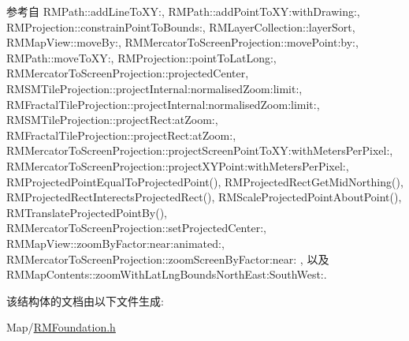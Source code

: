 参考自 R\-M\-Path\-::add\-Line\-To\-X\-Y\-:, R\-M\-Path\-::add\-Point\-To\-X\-Y\-:with\-Drawing\-:, R\-M\-Projection\-::constrain\-Point\-To\-Bounds\-:, R\-M\-Layer\-Collection\-::layer\-Sort, R\-M\-Map\-View\-::move\-By\-:, R\-M\-Mercator\-To\-Screen\-Projection\-::move\-Point\-:by\-:, R\-M\-Path\-::move\-To\-X\-Y\-:, R\-M\-Projection\-::point\-To\-Lat\-Long\-:, R\-M\-Mercator\-To\-Screen\-Projection\-::projected\-Center, R\-M\-S\-M\-Tile\-Projection\-::project\-Internal\-:normalised\-Zoom\-:limit\-:, R\-M\-Fractal\-Tile\-Projection\-::project\-Internal\-:normalised\-Zoom\-:limit\-:, R\-M\-S\-M\-Tile\-Projection\-::project\-Rect\-:at\-Zoom\-:, R\-M\-Fractal\-Tile\-Projection\-::project\-Rect\-:at\-Zoom\-:, R\-M\-Mercator\-To\-Screen\-Projection\-::project\-Screen\-Point\-To\-X\-Y\-:with\-Meters\-Per\-Pixel\-:, R\-M\-Mercator\-To\-Screen\-Projection\-::project\-X\-Y\-Point\-:with\-Meters\-Per\-Pixel\-:, R\-M\-Projected\-Point\-Equal\-To\-Projected\-Point(), R\-M\-Projected\-Rect\-Get\-Mid\-Northing(), R\-M\-Projected\-Rect\-Interects\-Projected\-Rect(), R\-M\-Scale\-Projected\-Point\-About\-Point(), R\-M\-Translate\-Projected\-Point\-By(), R\-M\-Mercator\-To\-Screen\-Projection\-::set\-Projected\-Center\-:, R\-M\-Map\-View\-::zoom\-By\-Factor\-:near\-:animated\-:, R\-M\-Mercator\-To\-Screen\-Projection\-::zoom\-Screen\-By\-Factor\-:near\-: , 以及 R\-M\-Map\-Contents\-::zoom\-With\-Lat\-Lng\-Bounds\-North\-East\-:\-South\-West\-:.



该结构体的文档由以下文件生成\-:\begin{DoxyCompactItemize}
\item 
Map/\hyperlink{_r_m_foundation_8h}{R\-M\-Foundation.\-h}\end{DoxyCompactItemize}
